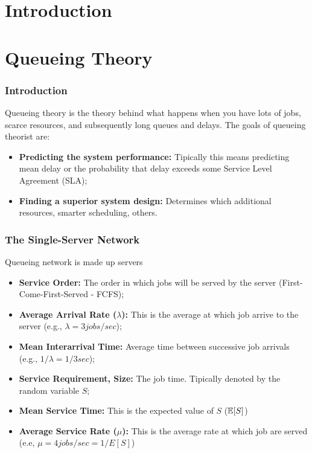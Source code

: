 




\section{Introduction} 


\section{Queueing Theory}

\begin{frame}
    \frametitle{Introduction}

    Queueing theory is the theory behind what happens when you have
    lots of jobs, scarce resources, and subsequently long queues and delays.
    The goals of queueing theorist are:

    \begin{itemize}
        \item \textbf{Predicting the system performance:} Tipically this means predicting mean delay or the 
        probability that delay exceeds some Service Level Agreement (SLA);
        
        \item \textbf{Finding a superior system design:} Determines which additional resources, smarter 
        scheduling, others.
    \end{itemize}


\end{frame}


\begin{frame}
    \frametitle{The Single-Server Network}

    Queueing network is made up servers

    \begin{itemize}
        \item \textbf{Service Order:} The order in which jobs will be served by 
        the server (First-Come-First-Served - FCFS);

        \item \textbf{Average Arrival Rate ($\lambda$):} This is the average at which job arrive
        to the server (e.g., $\lambda = 3 jobs/sec$);

        \item \textbf{Mean Interarrival Time:}  Average time between successive job
        arrivals (e.g., $1/\lambda = 1/3 sec$);

        \item \textbf{Service Requirement, Size:} The job time. Tipically denoted by 
        the random variable $S$;

        \item \textbf{Mean Service Time:} This is the expected value of $S$ ($\operatorname*{\mathbb{E}}[S]$)

        \item \textbf{Average Service Rate ($\mu$):} This is the average rate at which job 
        are served (e.e, $\mu = 4 jobs/sec = 1/E[S]$)
    \end{itemize}

\end{frame}



